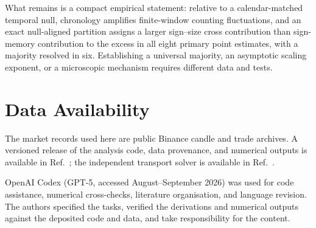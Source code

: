 \documentclass[aps,pre,twocolumn,superscriptaddress,floatfix,nofootinbib]{revtex4-2}
\begin{document}
What remains is a compact empirical statement: relative to a calendar-matched
temporal null, chronology amplifies finite-window counting fluctuations, and
an exact null-aligned partition assigns a larger sign--size cross contribution
than sign-memory contribution to the excess in all eight primary point
estimates, with a majority resolved in six. Establishing a universal majority,
an asymptotic scaling exponent, or a microscopic mechanism requires different
data and tests.

\section*{Data Availability}
The market records used here are public Binance candle and trade archives. A
versioned release of the analysis code, data provenance, and numerical outputs
is available in Ref.~\cite{code_keldysh_finance}; the independent transport
solver is available in Ref.~\cite{code_qteom}.

\begin{acknowledgments}
OpenAI Codex (GPT-5, accessed August--September 2026) was used for code
assistance, numerical cross-checks, literature organisation, and language
revision. The authors specified the tasks, verified the derivations and
numerical outputs against the deposited code and data, and take responsibility
for the content.
\end{acknowledgments}



\end{document}
